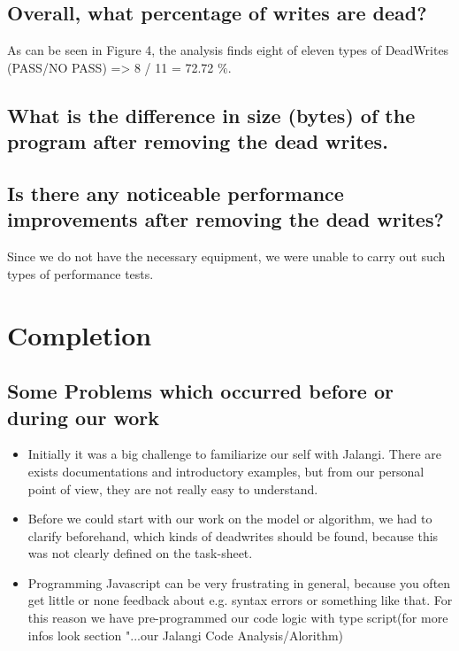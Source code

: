 \documentclass[a4paper]{scrartcl}
\begin{document}
\subsection{Overall, what percentage of writes are dead?}
As can be seen in Figure 4, the analysis finds eight of eleven types of DeadWrites (PASS/NO PASS) => 8 / 11 = 72.72 $\%$.
\subsection{What is the difference in size (bytes) of the program after removing the dead writes.}
\subsection{Is there any noticeable performance improvements after removing the dead writes?}
Since we do not have the necessary equipment, we were unable to carry out such types of performance tests.
\section{Completion}
\subsection{Some Problems which occurred before or during our work}
\begin{itemize}
\item Initially it was a big challenge to familiarize our self with Jalangi. There are exists documentations and introductory examples, but from our personal point of view, they are not really easy to understand.
\item Before we could start with our work on the model or algorithm, we had to clarify beforehand, which kinds of deadwrites should be found, because this was not clearly defined on the task-sheet.
\item Programming Javascript can be very frustrating in general, because you often get little or none feedback about e.g. syntax errors or something like that.  For this reason we have pre-programmed our code logic with type script(for more infos look section "...our Jalangi Code Analysis/Alorithm)
\end{itemize}
\end{document}
